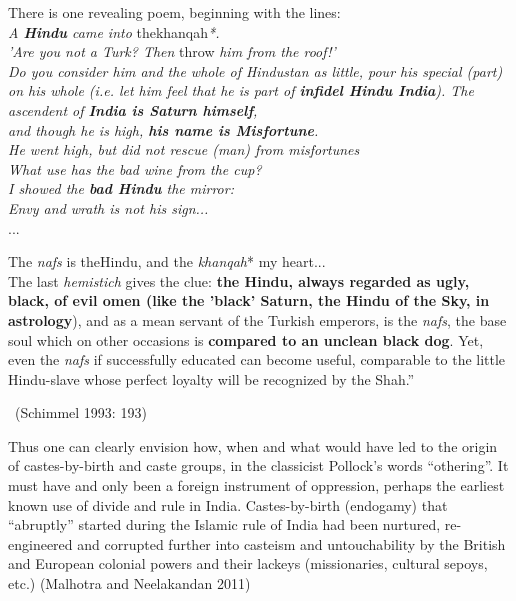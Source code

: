 \begin{myquote}
There is one revealing poem, beginning with the lines:\\\textit{A \textbf{Hindu} came into }thekhanqah\textit{*.}\\\textit{'Are you not a Turk? Then }throw\textit{ him from the roof!'\\ Do you consider him and the whole of Hindustan as little, pour his special (part) on his whole (i.e. let him feel that he is part of \textbf{infidel Hindu India}). The ascendent of \textbf{India is Saturn himself},\\ and though he is high, \textbf{his name is Misfortune}.\\ He went high, but did not rescue (man) from misfortunes\\ What use has the bad wine from the cup?\\ I showed the \textbf{bad Hindu} the mirror:}\\\textit{Envy and wrath is not his sign...}\\...
\end{myquote}

\begin{myquote}
The \textit{nafs} is theHindu, and the \textit{khanqah}* my heart...\\ The last \textit{hemistich} gives the clue: \textbf{the Hindu, always regarded as ugly, black, of evil omen (like the 'black' Saturn, the Hindu of the Sky, in astrology}), and as a mean servant of the Turkish emperors, is the \textit{nafs}, the base soul which on other occasions is \textbf{compared to an unclean black dog}. Yet, even the \textit{nafs} if successfully educated can become useful, comparable to the little Hindu-slave whose perfect loyalty will be recognized by the Shah.” 

~\hfill (Schimmel 1993: 193)
\end{myquote}

Thus one can clearly envision how, when and what would have led to the origin of castes-by-birth and caste groups, in the classicist Pollock's words “othering”. It must have and only been a foreign instrument of oppression, perhaps the earliest known use of divide and rule in India. Castes-by-birth (endogamy) that “abruptly” started during the Islamic rule of India had been nurtured, re-engineered and corrupted further into casteism and untouchability by the British and European colonial powers and their lackeys (missionaries, cultural sepoys, etc.) (Malhotra and Neelakandan 2011)

